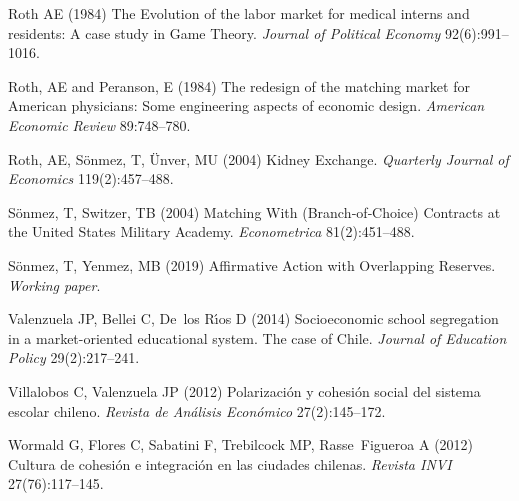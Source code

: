 \begin{thebibliography}{36}
Roth AE (1984) The {Evolution} of the labor market for medical interns and residents: A case study in Game Theory.
\emph{Journal of Political Economy} 92(6):991--1016.

Roth, AE and Peranson, E (1984) The redesign of the matching market for American physicians: Some engineering aspects of economic design.
\emph{American Economic Review} 89:748--780.

Roth, AE, S{\"{o}}nmez, T, {\"{U}}nver, MU (2004) Kidney Exchange.
\emph{Quarterly Journal of Economics} 119(2):457--488.

S{\"{o}}nmez, T, Switzer, TB (2004) Matching With (Branch‐of‐Choice) Contracts at the United States Military Academy.
\emph{Econometrica} 81(2):451--488.

S{\"{o}}nmez, T, Yenmez, MB (2019) Affirmative Action with Overlapping Reserves.
\emph{Working paper}.

Valenzuela JP, Bellei C, De~los R{\'\i}os D (2014) Socioeconomic school
  segregation in a market-oriented educational system. The case of Chile.
  \emph{Journal of Education Policy} 29(2):217--241.

Villalobos C, Valenzuela JP (2012) Polarizaci{\'o}n y cohesi{\'o}n social del
  sistema escolar chileno. \emph{Revista de An{\'a}lisis Econ{\'o}mico} 27(2):145--172.

Wormald G, Flores C, Sabatini F, Trebilcock MP, Rasse~Figueroa A (2012) Cultura
  de cohesi{\'o}n e integraci{\'o}n en las ciudades chilenas. \emph{Revista INVI} 27(76):117--145.

\end{thebibliography}
